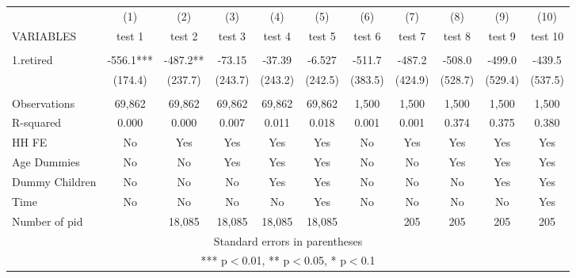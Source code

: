 \begin{tabular}{lcccccccccc} \hline
 & (1) & (2) & (3) & (4) & (5) & (6) & (7) & (8) & (9) & (10) \\
VARIABLES & test 1 & test 2 & test 3 & test 4 & test 5 & test 6 & test 7 & test 8 & test 9 & test 10 \\ \hline
 &  &  &  &  &  &  &  &  &  &  \\
1.retired & -556.1*** & -487.2** & -73.15 & -37.39 & -6.527 & -511.7 & -487.2 & -508.0 & -499.0 & -439.5 \\
 & (174.4) & (237.7) & (243.7) & (243.2) & (242.5) & (383.5) & (424.9) & (528.7) & (529.4) & (537.5) \\
 &  &  &  &  &  &  &  &  &  &  \\
Observations & 69,862 & 69,862 & 69,862 & 69,862 & 69,862 & 1,500 & 1,500 & 1,500 & 1,500 & 1,500 \\
R-squared & 0.000 & 0.000 & 0.007 & 0.011 & 0.018 & 0.001 & 0.001 & 0.374 & 0.375 & 0.380 \\
HH FE & No & Yes & Yes & Yes & Yes & No & Yes & Yes & Yes & Yes \\
Age Dummies & No & No & Yes & Yes & Yes & No & No & Yes & Yes & Yes \\
Dummy Children & No & No & No & Yes & Yes & No & No & No & Yes & Yes \\
Time & No & No & No & No & Yes & No & No & No & No & Yes \\
 Number of pid &  & 18,085 & 18,085 & 18,085 & 18,085 &  & 205 & 205 & 205 & 205 \\ \hline
\multicolumn{11}{c}{ Standard errors in parentheses} \\
\multicolumn{11}{c}{ *** p$<$0.01, ** p$<$0.05, * p$<$0.1} \\
\end{tabular}
